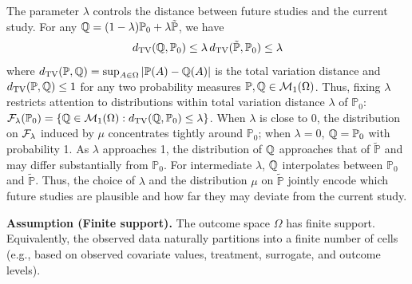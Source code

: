 \documentclass{article}
\newcommand{\PP}{\mathbb{P}}
\begin{document}
The parameter $\lambda$ controls the distance between future studies and the current study. For any $\Q = (1-\lambda)\PP_0 + \lambda\tilde{\PP}$, we have
\begin{align}\label{eq:distance-bound}
    d_{\mathrm{TV}}(\Q, \PP_0) \leq \lambda \, d_{\mathrm{TV}}(\tilde{\PP}, \PP_0) \leq \lambda
\end{align}
where $d_{\mathrm{TV}}(\PP, \Q) = \sup_{A \in \Omega} \left|\PP(A) - \Q(A)\right|$ is the total variation distance and $d_{\mathrm{TV}}(\PP, \Q) \leq 1$ for any two probability measures $\PP, \Q \in \cM_1(\Omega)$. Thus, fixing $\lambda$ restricts attention to distributions within total variation distance $\lambda$ of $\PP_0$: $\cF_\lambda(\PP_0) = \{\Q \in \cM_1(\Omega) : d_{\mathrm{TV}}(\Q, \PP_0) \leq \lambda\}$. When $\lambda$ is close to 0, the distribution on $\mathcal{F}_\lambda$ induced by $\mu$ concentrates tightly around $\PP_0$; when $\lambda = 0$, $\Q = \PP_0$ with probability 1. As $\lambda$ approaches 1, the distribution of $\mathbb{Q}$ approaches that of $\tilde{\PP}$ and may differ substantially from $\PP_0$. For intermediate $\lambda$, $\mathbb{Q}$ interpolates between $\PP_0$ and $\tilde{\PP}$. Thus, the choice of $\lambda$ and the distribution $\mu$ on $\tilde{\PP}$ jointly encode which future studies are plausible and how far they may deviate from the current study.

%
%

\noindent\textbf{Assumption (Finite support).}\label{ass:finite}
The outcome space $\Omega$ has finite support. Equivalently, the observed data naturally partitions into a finite number of cells (e.g., based on observed covariate values, treatment, surrogate, and outcome levels).
\end{document}
